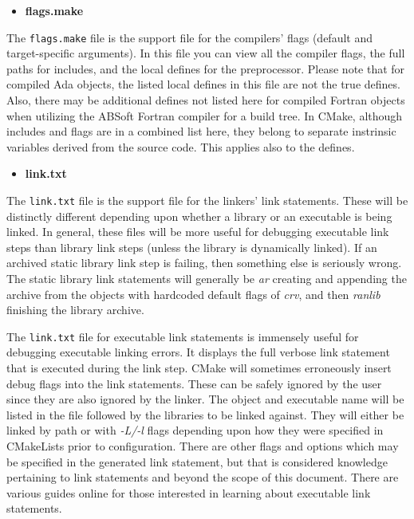 \documentclass[12pt,letterpaper]{article}
\begin{document}
\begin{itemize}
\item \textbf{flags.make}
\end{itemize}

The \verb|flags.make| file is the support file for the compilers' flags (default and target-specific arguments).  In this file you can view all the compiler flags, the full paths for includes, and the local defines for the preprocessor.  Please note that for compiled Ada objects, the listed local defines in this file are not the true defines.  Also, there may be additional defines not listed here for compiled Fortran objects when utilizing the ABSoft Fortran compiler for a build tree.  In CMake, although includes and flags are in a combined list here, they belong to separate instrinsic variables derived from the source code.  This applies also to the defines.

\begin{itemize}
\item \textbf{link.txt}
\end{itemize}

The \verb|link.txt| file is the support file for the linkers' link statements.  These will be distinctly different depending upon whether a library or an executable is being linked.  In general, these files will be more useful for debugging executable link steps than library link steps (unless the library is dynamically linked).  If an archived static library link step is failing, then something else is seriously wrong.  The static library link statements will generally be \emph{ar} creating and appending the archive from the objects with hardcoded default flags of \emph{crv}, and then \emph{ranlib} finishing the library archive.

The \verb|link.txt| file for executable link statements is immensely useful for debugging executable linking errors.  It displays the full verbose link statement that is executed during the link step.  CMake will sometimes erroneously insert debug flags into the link statements.  These can be safely ignored by the user since they are also ignored by the linker.  The object and executable name will be listed in the file followed by the libraries to be linked against.  They will either be linked by path or with \emph{-L/-l} flags depending upon how they were specified in CMakeLists prior to configuration.  There are other flags and options which may be specified in the generated link statement, but that is considered knowledge pertaining to link statements and beyond the scope of this document.  There are various guides online for those interested in learning about executable link statements.
\end{document}
